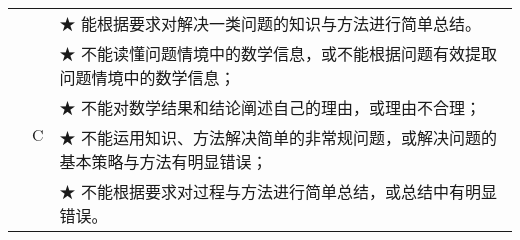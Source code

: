 \begin{itshape}
\begin{longtable}{|c|c|p{12cm}|}
   & &  ★ 能根据要求对解决一类问题的知识与方法进行简单总结。 \\        
\cline{2-3}   
   &   \multirow{4}{*}{C}  &  ★ 不能读懂问题情境中的数学信息，或不能根据问题有效提取问题情境中的数学信息；\\  
   & &  ★ 不能对数学结果和结论阐述自己的理由，或理由不合理；\\  
   & &  ★ 不能运用知识、方法解决简单的非常规问题，或解决问题的基本策略与方法有明显错误； \\   
   & &  ★ 不能根据要求对过程与方法进行简单总结，或总结中有明显错误。 \\   
    
\hline 
\end{longtable}
\end{itshape}

